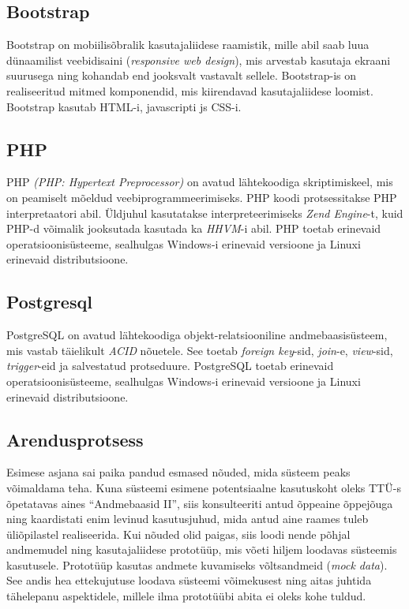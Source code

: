 \documentclass[a4paper,12pt]{article} %
\begin{document}
\subsection{Bootstrap}
Bootstrap on mobiilisõbralik kasutajaliidese raamistik, mille abil saab luua dünaamilist veebidisaini (\textit{responsive web design}), mis arvestab kasutaja ekraani suurusega ning kohandab end jooksvalt vastavalt sellele. Bootstrap-is on realiseeritud mitmed komponendid, mis kiirendavad kasutajaliidese loomist. Bootstrap kasutab HTML-i, javascripti js CSS-i. \cite{Bootstrap}
\subsection{PHP}
PHP \textit{(PHP: Hypertext Preprocessor)} on avatud lähtekoodiga skriptimiskeel, mis on peamiselt mõeldud veebiprogrammeerimiseks. \cite{What_Is_PHP} PHP koodi protsessitakse PHP interpretaatori abil. Üldjuhul kasutatakse interpreteerimiseks \textit{Zend Engine}-t, kuid PHP-d võimalik jooksutada kasutada ka \textit{HHVM}-i \cite{HHVM} abil. PHP toetab erinevaid operatsioonisüsteeme, sealhulgas Windows-i erinevaid versioone ja Linuxi erinevaid distributsioone.
\subsection{Postgresql}
PostgreSQL on avatud lähtekoodiga objekt-relatsiooniline andmebaasisüsteem, mis vastab täielikult \textit{ACID} nõuetele. See toetab \textit{foreign key}-sid, \textit{join}-e, \textit{view}-sid, \textit{trigger}-eid ja salvestatud protseduure. PostgreSQL toetab erinevaid operatsioonisüsteeme, sealhulgas Windows-i erinevaid versioone ja Linuxi erinevaid distributsioone.
\cite{PostgreSQL_About}
\subsection{Arendusprotsess}
Esimese asjana sai paika pandud esmased nõuded, mida süsteem peaks võimaldama teha. Kuna süsteemi esimene potentsiaalne kasutuskoht oleks TTÜ-s õpetatavas aines ``Andmebaasid II'', siis konsulteeriti antud õppeaine õppejõuga ning kaardistati enim levinud kasutusjuhud, mida antud aine raames tuleb üliõpilastel realiseerida. Kui nõuded olid paigas, siis loodi nende põhjal andmemudel ning kasutajaliidese prototüüp, mis võeti hiljem loodavas süsteemis kasutusele. Prototüüp kasutas andmete kuvamiseks võltsandmeid (\textit{mock data}). See andis hea ettekujutuse loodava süsteemi võimekusest ning aitas juhtida tähelepanu aspektidele, millele ilma prototüübi abita ei oleks kohe tuldud.\par
\end{document}
